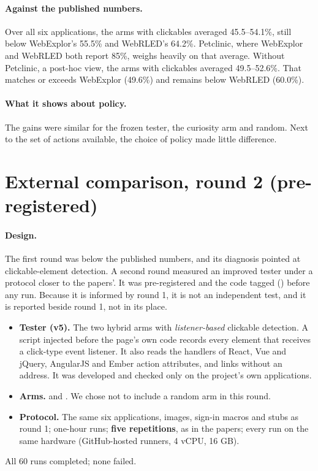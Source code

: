 \paragraph{Against the published numbers.} Over all six applications, the arms with
clickables averaged 45.5--54.1\%, still below WebExplor's 55.5\% and WebRLED's 64.2\%.
Petclinic, where WebExplor and WebRLED both report 85\%, weighs heavily on that average.
Without Petclinic, a post-hoc view, the arms with clickables averaged 49.5--52.6\%. That
matches or exceeds WebExplor (49.6\%) and remains below WebRLED (60.0\%).

\paragraph{What it shows about policy.} The gains were similar for the frozen tester, the
curiosity arm and random. Next to the set of actions available, the choice of policy made
little difference.

\section{External comparison, round 2 (pre-registered)}
\label{sec:round2}

\paragraph{Design.} The first round was below the published numbers, and its diagnosis
pointed at clickable-element detection. A second round measured an improved tester under a
protocol closer to the papers'. It was pre-registered and the code tagged
() before any run. Because it is informed by round 1, it is not an
independent test, and it is reported beside round 1, not in its place.
\begin{itemize}[noitemsep]
  \item \textbf{Tester (v5).} The two hybrid arms with \emph{listener-based} clickable
        detection. A script injected before the page's own code records every element that
        receives a click-type event listener. It also reads the handlers of React, Vue and
        jQuery, AngularJS and Ember action attributes, and links without an address. It was
        developed and checked only on the project's own applications.
  \item \textbf{Arms.}  and . We chose
        not to include a random arm in this round.
  \item \textbf{Protocol.} The same six applications, images, sign-in macros and stubs as
        round 1; one-hour runs; \textbf{five repetitions}, as in the papers; every run on
        the same hardware (GitHub-hosted runners, 4 vCPU, 16 GB).
\end{itemize}
All 60 runs completed; none failed.

